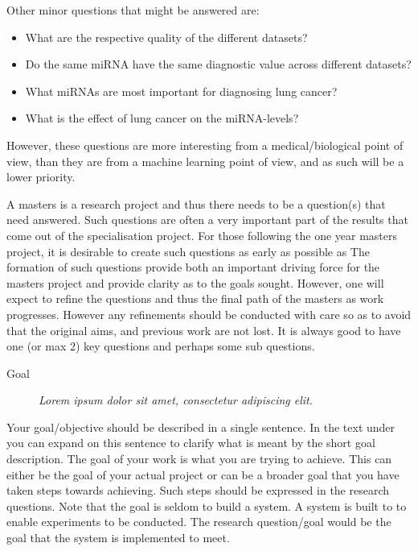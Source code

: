 Other minor questions that might be answered are:
\begin{itemize}
    \item What are the respective quality of the different datasets?
    \item Do the same miRNA have the same diagnostic value across different datasets?
    \item What miRNAs are most important for diagnosing lung cancer?
    \item What is the effect of lung cancer on the miRNA-levels?
\end{itemize}

However, these questions are more interesting from a medical/biological point of view, than they are from a machine learning point of view, and as such will be a lower priority.

\fi

\iffalse
A masters is a research project and thus there needs to be a question(s) that need answered. Such questions are often a very important part of the results that come out of the specialisation project. For those following the one year masters project, it is desirable to create such questions as early as possible as   The formation of such questions provide both an important driving force for the masters project and provide clarity as to the goals sought. However, one will expect to refine the questions and thus the final path of the masters as work progresses. However any refinements should be conducted with care so as to avoid that the original aims, and previous work are not lost.  
It is always good to have one (or max 2) key questions and perhaps some sub questions. 

\begin{description}
\item[Goal] {\it Lorem ipsum dolor sit amet, consectetur adipiscing elit.}
\end{description}

Your goal/objective should be described in a single sentence. In the text under you can expand on this sentence to clarify what is meant by the short goal description. 
The goal of your work is what you are trying to achieve. This can either be the goal of your actual project or can be a broader goal that you have taken steps towards achieving. Such steps should be expressed in the research questions. 
Note that the goal is seldom to build a system. A system is built to to enable experiments to be conducted. The research question/goal would be the goal that the system is implemented to meet.  


